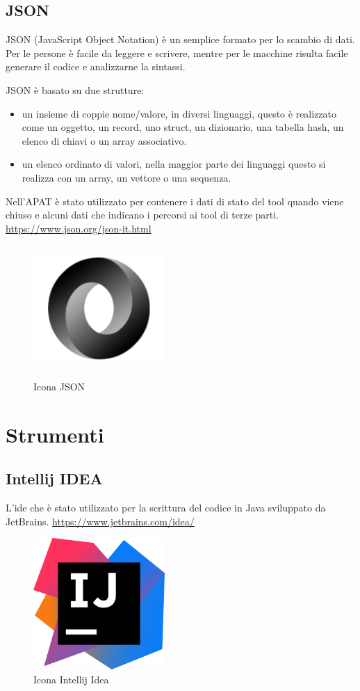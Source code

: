 \subsection*{JSON}
JSON (JavaScript Object Notation) è un semplice formato per lo scambio di dati.
Per le persone è facile da leggere e scrivere, mentre per le macchine risulta facile generare il codice e analizzarne la sintassi.

JSON è basato su due strutture:
\begin{itemize}
    \item un insieme di coppie nome/valore, in diversi linguaggi, questo è realizzato come un oggetto, un record, uno struct, un dizionario, una tabella hash, un elenco di chiavi o un array associativo.
    \item un elenco ordinato di valori, nella maggior parte dei linguaggi questo si realizza con un array, un vettore o una sequenza.
\end{itemize}
Nell'APAT è stato utilizzato per contenere i dati di stato del tool quando viene chiuso e alcuni dati che indicano i percorsi ai tool di terze parti.
\url{https://www.json.org/json-it.html}
\begin{figure}[H]
    \centering
    \includegraphics[width=5cm, height=5cm]{./immagini/json.png}
    \caption{Icona JSON}\label{fig:json}
\end{figure}



\section{Strumenti}\label{sec:strumenti}

\subsection*{Intellij IDEA}
L'\gls{ide} che è stato utilizzato per la scrittura del codice in Java sviluppato da JetBrains.
\url{https://www.jetbrains.com/idea/}
\begin{figure}[H]
    \centering
    \includegraphics[width=5cm, height=5cm]{./immagini/intellij.png}
    \caption{Icona Intellij Idea}\label{fig:intellij}
\end{figure}

